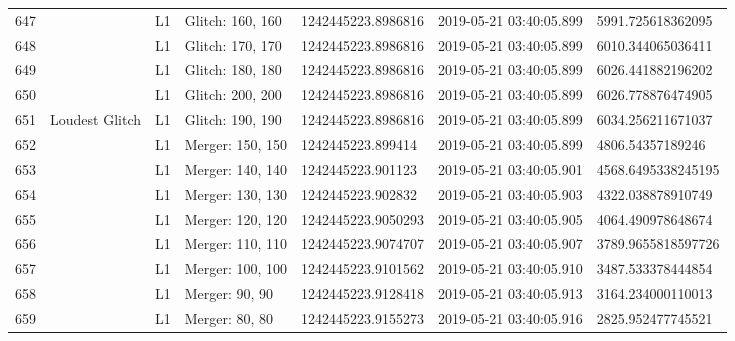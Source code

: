 \begin{longtable}{lllllll}
647  &                                                    &       L1 &  Glitch: 160, 160 &  1242445223.8986816 &  2019-05-21 03:40:05.899 &   5991.725618362095 \\
648  &                                                    &       L1 &  Glitch: 170, 170 &  1242445223.8986816 &  2019-05-21 03:40:05.899 &   6010.344065036411 \\
649  &                                                    &       L1 &  Glitch: 180, 180 &  1242445223.8986816 &  2019-05-21 03:40:05.899 &   6026.441882196202 \\
650  &                                                    &       L1 &  Glitch: 200, 200 &  1242445223.8986816 &  2019-05-21 03:40:05.899 &   6026.778876474905 \\
651  &                                     Loudest Glitch &       L1 &  Glitch: 190, 190 &  1242445223.8986816 &  2019-05-21 03:40:05.899 &   6034.256211671037 \\
652  &                                                    &       L1 &  Merger: 150, 150 &   1242445223.899414 &  2019-05-21 03:40:05.899 &    4806.54357189246 \\
653  &                                                    &       L1 &  Merger: 140, 140 &   1242445223.901123 &  2019-05-21 03:40:05.901 &  4568.6495338245195 \\
654  &                                                    &       L1 &  Merger: 130, 130 &   1242445223.902832 &  2019-05-21 03:40:05.903 &   4322.038878910749 \\
655  &                                                    &       L1 &  Merger: 120, 120 &  1242445223.9050293 &  2019-05-21 03:40:05.905 &   4064.490978648674 \\
656  &                                                    &       L1 &  Merger: 110, 110 &  1242445223.9074707 &  2019-05-21 03:40:05.907 &  3789.9655818597726 \\
657  &                                                    &       L1 &  Merger: 100, 100 &  1242445223.9101562 &  2019-05-21 03:40:05.910 &   3487.533378444854 \\
658  &                                                    &       L1 &    Merger: 90, 90 &  1242445223.9128418 &  2019-05-21 03:40:05.913 &   3164.234000110013 \\
659  &                                                    &       L1 &    Merger: 80, 80 &  1242445223.9155273 &  2019-05-21 03:40:05.916 &   2825.952477745521 \\

\end{longtable}
